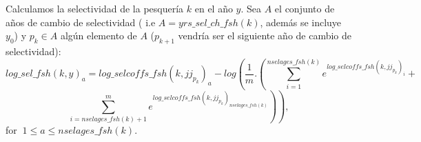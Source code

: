 \documentclass{article}
\begin{document}
\begin{itemize}



Calculamos la selectividad de la pesquería $k$ en el año $y$. Sea $A$ el conjunto de años de cambio de selectividad ( i.e $A= yrs\_sel\_ch\_fsh(k)$, además se incluye $y_0$) y $p_k\in A$  algún elemento de $A$ ($p_{k+1}$ vendría ser el siguiente año de cambio de selectividad):
 \begin{equation}
        log\_sel\_fsh(k,y)_a=log\_selcoffs\_fsh(k,jj_{p_k})_a-log\left(\dfrac{1}{m}.\left(\sum_{i=1}^{nselages\_fsh(k)}e^{log\_selcoffs\_fsh(k,jj_{p_k})_i}+\right.\right.
    \end{equation}
    \begin{equation*}
       \left. \left.\sum_{i=nselages\_fsh(k)+1}^{m}e^{log\_selcoffs\_fsh(k,jj_{p_k})_{nselages\_fsh(k)}}\right)\right), 
    \end{equation*}
   for $\ 1\leq a \leq nselages\_fsh(k)$.\\
   

\end{itemize}
\end{document}
